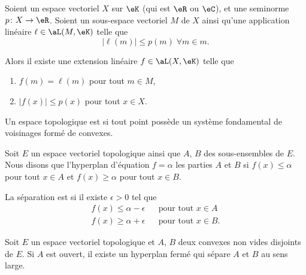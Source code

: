 \begin{theorem}		\label{THOooVQLJooWuBMoZ}
	Soient un espace vectoriel \( X\) sur \( \eK\) (qui est \( \eR\) ou \( \eC\)), et une seminorme \(p \colon X\to \eR  \). Soient un sous-espace vectoriel \( M\) de \( X\) ainsi qu'une application linéaire \( \ell\in\aL(M,\eK)\) telle que
	\begin{equation}
		| \ell(m) |\leq p(m)\;\forall m\in m.
	\end{equation}

	Alors il existe une extension linéaire \( f\in\aL(X,\eK)\) telle que
	\begin{enumerate}
		\item
		      \( f(m)=\ell(m)\) pour tout \( m\in M\),
		\item
		      \( | f(x) |\leq p(x)\) pour tout \( x\in X\).
	\end{enumerate}
\end{theorem}

\begin{definition}  \label{DefPJokvAa}
	Un espace topologique est  si tout point possède un système fondamental de voisinages formé de convexes.
\end{definition}

\begin{definition}
	Soit \( E\) un espace vectoriel topologique ainsi que \( A\), \( B\) des sous-ensembles de \( E\). Nous disons que l'hyperplan d'équation \( f=\alpha\)  les parties \( A\) et \( B\) si \( f(x)\leq \alpha\) pour tout \( x\in A\) et \( f(x)\geq \alpha\) pour tout \( x\in B\).

	La séparation est  si il existe \( \epsilon>0\) tel que
	\begin{subequations}
		\begin{align}
			f(x)\leq \alpha-\epsilon &  & \text{pour tout } x\in A  \\
			f(x)\geq \alpha+\epsilon &  & \text{pour tout } x\in B.
		\end{align}
	\end{subequations}
\end{definition}

\begin{theorem}  \label{ThoSAJjdZc}
	Soit \( E\) un espace vectoriel topologique et \( A\), \( B\) deux convexes non vides disjoints de \( E\). Si \( A\) est ouvert, il existe un hyperplan fermé qui sépare \( A\) et \( B\) au sens large.
\end{theorem}

